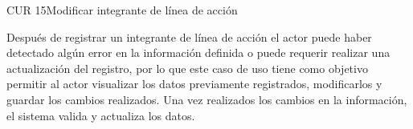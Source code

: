 
\begin{UseCase}{CUR 15}{Modificar integrante de línea de acción}
	{
	 Después de registrar un integrante de línea de acción el actor puede haber detectado algún error en la información definida o puede requerir realizar una actualización del registro, por lo que este caso de uso tiene como objetivo permitir al actor visualizar los datos previamente registrados, modificarlos y guardar los cambios realizados. Una vez realizados los cambios en la información, el sistema valida y actualiza los datos. 

	}
	




\end{UseCase}
